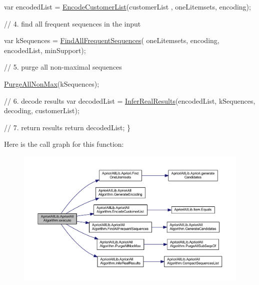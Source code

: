 \begin{DoxyCode}
            var encodedList = \hyperlink{class_apriori_all_lib_1_1_apriori_all_algorithm_a2250ee6a09f30990fc8e6f50d0600bdc}{EncodeCustomerList}(customerList
      , oneLitemsets, encoding);

            \textcolor{comment}{// 4. find all frequent sequences in the input}

            var kSequences = \hyperlink{class_apriori_all_lib_1_1_apriori_all_algorithm_ae57be8bc7c5996b4687db96e333acc6a}{FindAllFrequentSequences}(
      oneLitemsets, encoding, encodedList, minSupport);

            \textcolor{comment}{// 5. purge all non-maximal sequences}

            \hyperlink{class_apriori_all_lib_1_1_apriori_all_algorithm_a9f9a1d34d48761a094d3390c2e9d90cd}{PurgeAllNonMax}(kSequences);

            \textcolor{comment}{// 6. decode results}
            var decodedList = \hyperlink{class_apriori_all_lib_1_1_apriori_all_algorithm_a9b1affa47b8ad14eedeaec9ac17bb8c1}{InferRealResults}(encodedList, 
      kSequences, decoding, customerList);

            \textcolor{comment}{// 7. return results}
            \textcolor{keywordflow}{return} decodedList;
        \}
\end{DoxyCode}


Here is the call graph for this function\-:
\nopagebreak
\begin{figure}[H]
\begin{center}
\leavevmode
\includegraphics[width=350pt]{class_apriori_all_lib_1_1_apriori_all_algorithm_ae4f86f8c88052d29cbfc629f2f61c302_cgraph}
\end{center}
\end{figure}


